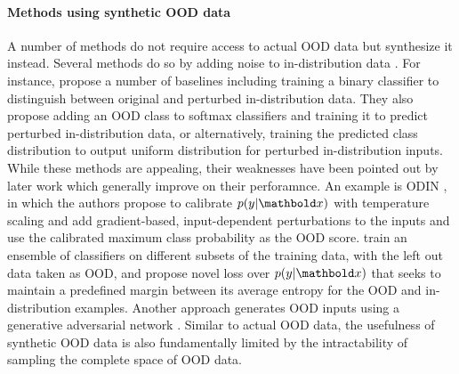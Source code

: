 \paragraph{Methods using synthetic OOD data}
A number of methods do not require access to actual OOD data but synthesize it instead. 
Several methods do so by adding noise to in-distribution data \parencite{liang_enhancing_2018, lee_simple_2018, ren_likelihood_2019}. 
For instance, \textcite{ren_likelihood_2019} propose a number of baselines including training a binary classifier to distinguish between original and perturbed in-distribution data. They also propose adding an OOD class to softmax classifiers and training it to predict perturbed in-distribution data, or alternatively, training the predicted class distribution to output uniform distribution for perturbed in-distribution inputs. 
While these methods are appealing, their weaknesses have been pointed out by later work which generally improve on their perforamnce. An example is ODIN \parencite{liang_enhancing_2018}, in which the authors propose to calibrate $p(y|\xb)$ with temperature scaling \parencite{guo_calibration_2017} and add gradient-based, input-dependent perturbations to the inputs and use the calibrated maximum class probability as the OOD score. 
\textcite{vyas_outofdistribution_2018} train an ensemble of classifiers on different subsets of the training data, with the left out data taken as OOD, and propose novel loss over $p(y|\xb)$ that seeks to maintain a predefined margin between its average entropy for the OOD and in-distribution examples. 
Another approach generates OOD inputs using a generative adversarial network \parencite{lee_training_2018}. 
Similar to actual OOD data, the usefulness of synthetic OOD data is also fundamentally limited by the intractability of sampling the complete space of OOD data.

